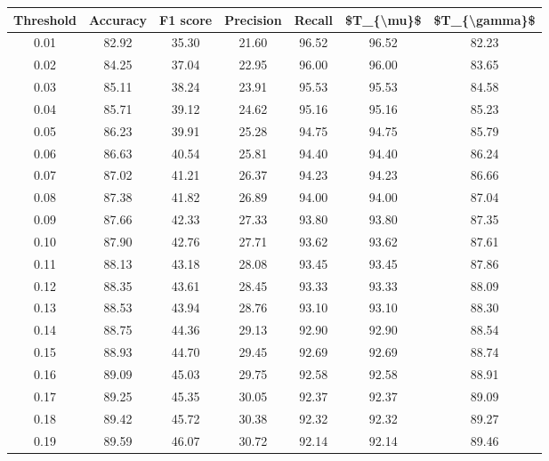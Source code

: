 \begin{tabular}{|c|c|c|c|c|c|c|}
\hline
 Threshold &  Accuracy &  F1 score &  Precision &  Recall &  \$T\_\{\textbackslash mu\}\$ &  \$T\_\{\textbackslash gamma\}\$ \\
\hline
      0.01 &     82.92 &     35.30 &      21.60 &   96.52 &      96.52 &         82.23 \\
      0.02 &     84.25 &     37.04 &      22.95 &   96.00 &      96.00 &         83.65 \\
      0.03 &     85.11 &     38.24 &      23.91 &   95.53 &      95.53 &         84.58 \\
      0.04 &     85.71 &     39.12 &      24.62 &   95.16 &      95.16 &         85.23 \\
      0.05 &     86.23 &     39.91 &      25.28 &   94.75 &      94.75 &         85.79 \\
      0.06 &     86.63 &     40.54 &      25.81 &   94.40 &      94.40 &         86.24 \\
      0.07 &     87.02 &     41.21 &      26.37 &   94.23 &      94.23 &         86.66 \\
      0.08 &     87.38 &     41.82 &      26.89 &   94.00 &      94.00 &         87.04 \\
      0.09 &     87.66 &     42.33 &      27.33 &   93.80 &      93.80 &         87.35 \\
      0.10 &     87.90 &     42.76 &      27.71 &   93.62 &      93.62 &         87.61 \\
      0.11 &     88.13 &     43.18 &      28.08 &   93.45 &      93.45 &         87.86 \\
      0.12 &     88.35 &     43.61 &      28.45 &   93.33 &      93.33 &         88.09 \\
      0.13 &     88.53 &     43.94 &      28.76 &   93.10 &      93.10 &         88.30 \\
      0.14 &     88.75 &     44.36 &      29.13 &   92.90 &      92.90 &         88.54 \\
      0.15 &     88.93 &     44.70 &      29.45 &   92.69 &      92.69 &         88.74 \\
      0.16 &     89.09 &     45.03 &      29.75 &   92.58 &      92.58 &         88.91 \\
      0.17 &     89.25 &     45.35 &      30.05 &   92.37 &      92.37 &         89.09 \\
      0.18 &     89.42 &     45.72 &      30.38 &   92.32 &      92.32 &         89.27 \\
      0.19 &     89.59 &     46.07 &      30.72 &   92.14 &      92.14 &         89.46 \\

\end{tabular}

